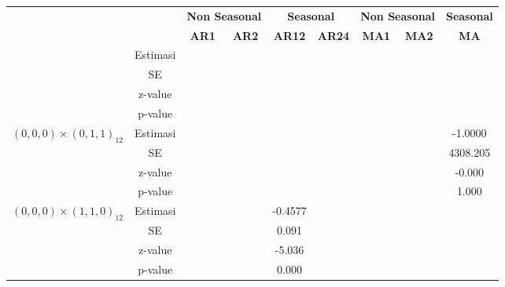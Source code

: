 \begin{enumerate}[label=\alph*.]
\begin{longtable}{|c|c|c|c|c|c|c|c|c|}
            & &
            \multicolumn{2}{c|}{\textbf{Non Seasonal}} &
            \multicolumn{2}{c|}{\textbf{Seasonal}} &
            \multicolumn{2}{c|}{\textbf{Non Seasonal}} &
            \textbf{Seasonal} \\ \cline{3-9}

            & &
            \textbf{AR1} & \textbf{AR2} &
            \textbf{AR12} & \textbf{AR24} &
            \textbf{MA1} & \textbf{MA2} &
            \textbf{MA} \\ \hline
            \endhead

            \hline
            \endfoot

            \hline
            \endlastfoot


            \hline
            \multirow{4}{*}{$(0,0,0)\times(0,1,0)_{12}$}
            & Estimasi & {} & {} & {} & {} & {} & {} & {} \\ \cline{2-9}
            & SE       & {} & {} & {} & {} & {} & {} & {}\\ \cline{2-9}
            & z-value  &  {}   & {} & {} & {} & {} & {} & {} \\ \cline{2-9}
            & p-value  & {} & {} & {} & {} & {} & {} & {} \\ \hline

            \multirow{4}{*}{$(0,0,0)\times(0,1,1)_{12}$}
            & Estimasi & {} & {} & {} & {} & {} & {} & -1.0000 \\ \cline{2-9}
            & SE       & {} & {} & {} & {} & {} & {} & 4308.205\\ \cline{2-9}
            & z-value  &  {}   & {} & {} & {} & {} & {} & -0.000 \\ \cline{2-9}
            & p-value  & {} & {} & {} & {} & {} & {} & 1.000 \\ \hline

            \multirow{4}{*}{$(0,0,0)\times(1,1,0)_{12}$}
            & Estimasi & {} & {} & -0.4577 & {} & {} & {} & {} \\ \cline{2-9}
            & SE       & {} & {} & 0.091 & {} & {} & {} & {}\\ \cline{2-9}
            & z-value  & {} & {} & -5.036 & {} & {} & {} & {}\\ \cline{2-9}
            & p-value  & {} & {} & 0.000 & {} & {} & {} & {}\\ \hline


\end{longtable}
\end{enumerate}
